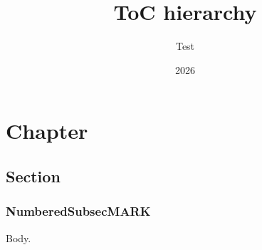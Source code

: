 \documentclass{e_class_noteLong}
\title{ToC hierarchy}\author{Test}\date{2026}
\begin{document}
\maketitle
\mytoc
\chapter{Chapter}
\section{Section}
\subsection{NumberedSubsecMARK}
Body.
\end{document}
